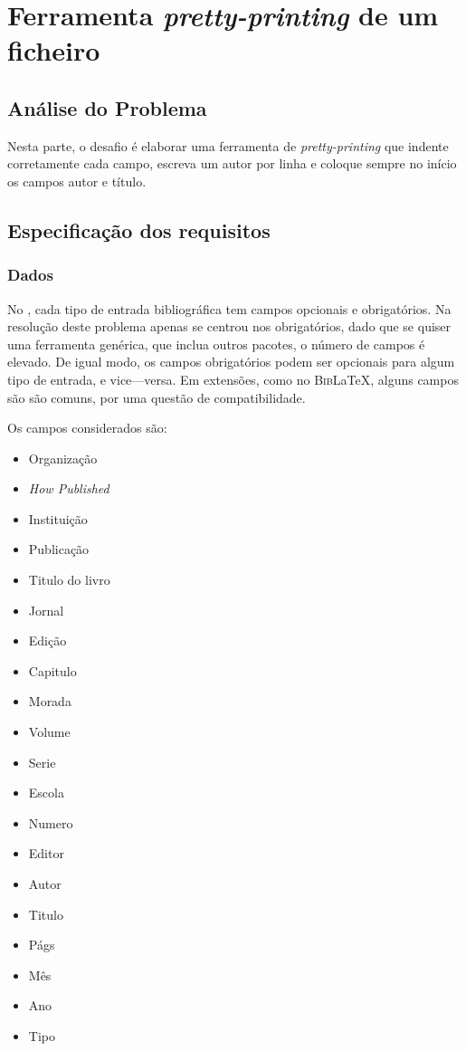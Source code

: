 \chapter{Ferramenta \emph{pretty-printing} de um ficheiro }
\label{chap:b2}

\section{Análise do Problema}
\label{sec:b2p:b2}
Nesta parte, o desafio é elaborar uma ferramenta de \emph{pretty-printing} que
indente corretamente cada campo, escreva um autor por linha e coloque sempre no
início os campos autor e título.

\section{Especificação dos requisitos}
\label{sec:spec:b2}

\subsection{Dados}

No , cada tipo de entrada bibliográfica tem campos opcionais
e obrigatórios. Na resolução deste problema apenas se centrou nos obrigatórios,
dado que se quiser uma ferramenta genérica, que inclua outros pacotes, o número
de campos é elevado. De igual modo, os campos obrigatórios podem ser opcionais
para algum tipo de entrada, e vice---versa. Em extensões, como no
\textsc{Bib}\LaTeX{}, alguns campos são são comuns, por uma questão de compatibilidade.

Os campos considerados são:

\begin{itemize}


\item Organização
\item \emph{How Published}
\item Instituição
\item Publicação
\item Titulo do livro
\item Jornal
\item Edição
\item Capitulo
\item Morada
\item Volume
\item Serie
\item Escola
\item Numero
\item Editor
\item Autor
\item Titulo
\item Págs
\item Mês
\item Ano
\item Tipo

\end{itemize}

